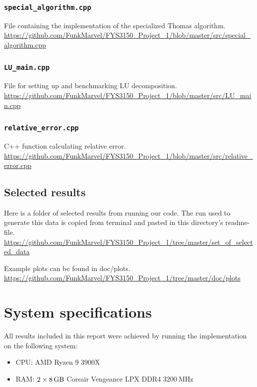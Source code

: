 \documentclass[english,notitlepage,reprint,nofootinbib]{revtex4-1}  %
\begin{document}
\cprotect\subsubsection{\verb+special_algorithm.cpp+} \label{A.1.f}
File containing the implementation of the specialized Thomas algorithm.
\url{https://github.com/FunkMarvel/FYS3150_Project_1/blob/master/src/special_algorithm.cpp}

\cprotect\subsubsection{\verb+LU_main.cpp+} \label{A.1.g}
File for setting up and benchmarking LU decomposition.
\url{https://github.com/FunkMarvel/FYS3150_Project_1/blob/master/src/LU_main.cpp}

\cprotect\subsubsection{\verb+relative_error.cpp+} \label{A.1.h}
C++ function calculating relative error.
\url{https://github.com/FunkMarvel/FYS3150_Project_1/blob/master/src/relative_error.cpp}

\subsection{Selected results} \label{A.2}
Here is a folder of selected results from running our code. The run used to generate this data is copied from terminal and pasted in this directory's readme-file.
\url{https://github.com/FunkMarvel/FYS3150_Project_1/tree/master/set_of_selected_data}

Example plots can be found in doc/plots.
\url{https://github.com/FunkMarvel/FYS3150_Project_1/tree/master/doc/plots}

\section{System specifications} \label{B}
All results included in this report were achieved by running the implementation on the following system:
\begin{itemize}
	\item CPU: AMD Ryzen \(9\) \(3900\)X
	\item RAM: \(2\times\SI{8}{\giga\byte}\) Corsair Vengeance LPX DDR\(4\) \(\SI{3200}{\mega\hertz}\)
\end{itemize}
\end{document}
